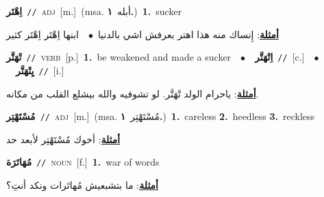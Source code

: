 \documentclass[10pt,a4paper,twoside]{article} %
\begin{document}
\begin{multicols}{2}
{\setlength\topsep{0pt}\textbf{\foreignlanguage{arabic}{اِهْتَر}}\ {\color{gray}\texttt{//}\color{black}}\ \textsc{adj}\ [m.]\ \color{gray}(msa. \foreignlanguage{arabic}{أبله}~\foreignlanguage{arabic}{\textbf{١.}})\color{black}\ \textbf{1.}~sucker\  \begin{flushright}\color{gray}\foreignlanguage{arabic}{\textbf{\underline{\foreignlanguage{arabic}{أمثلة}}}: إِنساك منه هذا اهتر بعرفش اشي بالدنيا\ $\bullet$\ \  ابنها اِهْتَر اِهْتَر كثير}\end{flushright}\color{black}} \vspace{2mm}

{\setlength\topsep{0pt}\textbf{\foreignlanguage{arabic}{تْهَتَّر}}\ {\color{gray}\texttt{//}\color{black}}\ \textsc{verb}\ [p.]\ \textbf{1.}~be weakened and made a sucker\ \ $\bullet$\ \ \setlength\topsep{0pt}\textbf{\foreignlanguage{arabic}{اِتْهَتَّر}}\ {\color{gray}\texttt{//}\color{black}}\ [c.]\ \ $\bullet$\ \ \setlength\topsep{0pt}\textbf{\foreignlanguage{arabic}{يِتْهَتَّر}}\ {\color{gray}\texttt{//}\color{black}}\ [i.]\  \begin{flushright}\color{gray}\foreignlanguage{arabic}{\textbf{\underline{\foreignlanguage{arabic}{أمثلة}}}: ياحرام الولد تْهَتَّر. لو تشوفيه والله بيشلع القلب من مكانه.}\end{flushright}\color{black}} \vspace{2mm}

{\setlength\topsep{0pt}\textbf{\foreignlanguage{arabic}{مُسْتَهْتِر}}\ {\color{gray}\texttt{//}\color{black}}\ \textsc{adj}\ [m.]\ \color{gray}(msa. \foreignlanguage{arabic}{مُسْتَهْتِر}~\foreignlanguage{arabic}{\textbf{١.}})\color{black}\ \textbf{1.}~careless  \textbf{2.}~heedless  \textbf{3.}~reckless\  \begin{flushright}\color{gray}\foreignlanguage{arabic}{\textbf{\underline{\foreignlanguage{arabic}{أمثلة}}}: أخوك مُسْتَهْتِر لأبعد حد}\end{flushright}\color{black}} \vspace{2mm}

{\setlength\topsep{0pt}\textbf{\foreignlanguage{arabic}{مُهَاتَرَة}}\ {\color{gray}\texttt{//}\color{black}}\ \textsc{noun}\ [f.]\ \textbf{1.}~war of words\  \begin{flushright}\color{gray}\foreignlanguage{arabic}{\textbf{\underline{\foreignlanguage{arabic}{أمثلة}}}: ما بتشبعيش مُهاتَرات ونكد أنتِ؟}\end{flushright}\color{black}} \vspace{2mm}


\end{multicols}
\end{document}
